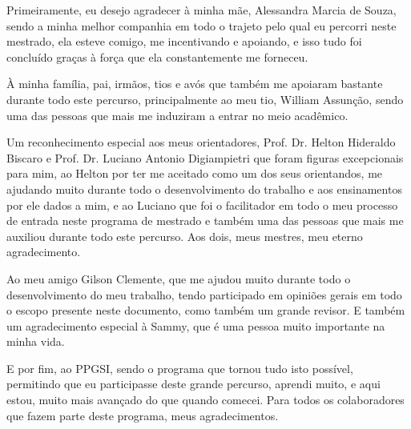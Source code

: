 \documentclass[
	12pt,				%
	oneside,			%
	a4paper,			%
	english,			%
	brazil				%
	]{abntex2ppgsi}
\begin{document}
%
% 
% 
%
%
%
\begin{agradecimentos}
Primeiramente, eu desejo agradecer à minha mãe, Alessandra Marcia de Souza, sendo a minha melhor companhia em todo o trajeto pelo qual eu percorri neste mestrado, ela esteve comigo, me incentivando e apoiando, e isso tudo foi concluído graças à força que ela constantemente me forneceu.

À minha família, pai, irmãos, tios e avós que também me apoiaram bastante durante todo este percurso, principalmente ao meu tio, William Assunção, sendo uma das pessoas que mais me induziram a entrar no meio acadêmico.

Um reconhecimento especial aos meus orientadores, Prof. Dr. Helton Hideraldo Biscaro e Prof. Dr. Luciano Antonio Digiampietri que foram figuras excepcionais para mim, ao Helton por ter me aceitado como um dos seus orientandos, me ajudando muito durante todo o desenvolvimento do trabalho e aos ensinamentos por ele dados a mim, e ao Luciano que foi o facilitador em todo o meu processo de entrada neste programa de mestrado e também uma das pessoas que mais me auxiliou durante todo este percurso. Aos dois, meus mestres, meu eterno agradecimento.

Ao meu amigo Gilson Clemente, que me ajudou muito durante todo o desenvolvimento do meu trabalho, tendo participado em opiniões gerais em todo o escopo presente neste documento, como também um grande revisor. E também um agradecimento especial à Sammy, que é uma pessoa muito importante na minha vida.

E por fim, ao PPGSI, sendo o programa que tornou tudo isto possível, permitindo que eu participasse deste grande percurso, aprendi muito, e aqui estou, muito mais avançado do que quando comecei. Para todos os colaboradores que fazem parte deste programa, meus agradecimentos.
\end{agradecimentos}
\end{document}
